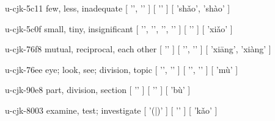 \begin{multicols}{2}
\cjkgGlue{} u-cjk-5c11  few, less, inadequate  [ '\cjkgGlue{}', '\cjkgGlue{}' ]  [ '\cjkgGlue{}' ]  [ 'sh{\mktsRsgFb{}ǎ}o', 'shào' ] 

\cjkgGlue{} u-cjk-5c0f  small, tiny, insignificant  [ '\cjkgGlue{}', '\cjkgGlue{}', '\cjkgGlue{}', '\cjkgGlue{}' ]  [ '\cjkgGlue{}' ]  [ 'xi{\mktsRsgFb{}ǎ}o' ] 

\cjkgGlue{} u-cjk-76f8  mutual, reciprocal, each other  [ '\cjkgGlue{}' ]  [ '\cjkgGlue{}', '\cjkgGlue{}' ]  [ 'xi{\mktsRsgFb{}ā}ng', 'xiàng' ] 

\cjkgGlue{} u-cjk-76ee  eye; look, see; division, topic  [ '\cjkgGlue{}', '\cjkgGlue{}' ]  [ '\cjkgGlue{}', '\cjkgGlue{}' ]  [ 'mù' ] 

\cjkgGlue{} u-cjk-90e8  part, division, section  [ '\cjkgGlue{}' ]  [ '\cjkgGlue{}' ]  [ 'bù' ] 

\cjkgGlue{} u-cjk-8003  examine, test; investigate  [ '\cjkgGlue{}(\cjkgGlue{}|\cjkgGlue{})' ]  [ '\cjkgGlue{}' ]  [ 'k{\mktsRsgFb{}ǎ}o' ] 


\end{multicols}
